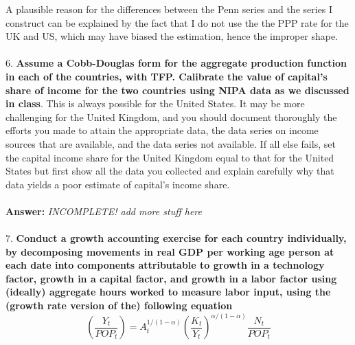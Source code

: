 \documentclass[11pt]{article}
\theoremstyle{mytheoremstyle}
\theoremstyle{mytheoremstyle}
\theoremstyle{myproblemstyle}
\begin{document}
A plausible reason for the differences between the Penn series and the series I construct can be explained by the fact that I do not use the the PPP rate for the UK and US, which may have biased the estimation, hence the improper shape. 
\\ \\ 
6. \textbf{Assume a Cobb-Douglas form for the aggregate production function in each of the countries, with TFP. Calibrate the value of capital’s share of income for the two countries using NIPA data as we discussed in class}. This is always possible for the United States. It may be more challenging for the United Kingdom, and you should document thoroughly the efforts you made to attain the appropriate data, the data series on income sources that are available, and the data series not available. If all else fails, set the capital income share for the United Kingdom equal to that for the United States but first show all the data you collected and explain carefully why that data yields a poor estimate of capital’s income share.
\\ \\ 
\textbf{Answer:} \textit{INCOMPLETE! add more stuff here}
\\ \\ 
7. \textbf{Conduct a growth accounting exercise for each country individually, by decomposing movements in real GDP per working age person at each date into components attributable to growth in a technology factor, growth in a capital factor, and growth in a labor factor using (ideally) aggregate hours worked to measure labor input, using the (growth rate version of the) following equation}
$$
\left(\frac{Y_t}{P O P_t}\right)=A_t^{1 /(1-\alpha)}\left(\frac{K_t}{Y_t}\right)^{\alpha /(1-\alpha)} \frac{N_t}{P O P_t}
$$
\end{document}
